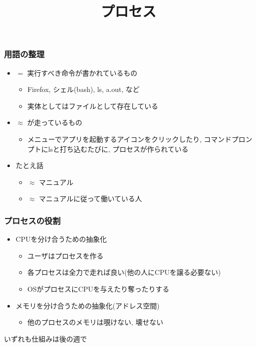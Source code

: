 \documentclass[12pt,dvipdfmx]{beamer}
\title{プロセス}
\begin{document}
\maketitle



\begin{frame}
\frametitle{用語の整理}
\begin{itemize}
\item {} $=$ 実行すべき命令が書かれているもの
  \begin{itemize}
  \item Firefox, シェル(bash), ls, a.out, など
  \item 実体としてはファイルとして存在している
  \end{itemize}
\item {} $\approx$ が走っているもの
  \begin{itemize}
  \item メニューでアプリを起動するアイコンをクリックしたり,
    コマンドプロンプトにlsと打ち込むたびに, プロセスが作られている
  \end{itemize}
\item たとえ話
  \begin{itemize}
  \item {} $\approx$ マニュアル
  \item {} $\approx$ マニュアルに従って働いている人
  \end{itemize}
\end{itemize}
\end{frame}

\begin{frame}
\frametitle{プロセスの役割}
\begin{itemize}
\item CPUを分け合うための抽象化
  \begin{itemize}
  \item ユーザはプロセスを作る
  \item 各プロセスは全力で走れば良い(他の人にCPUを譲る必要ない)
  \item OSがプロセスにCPUを与えたり奪ったりする
  \end{itemize}
\item メモリを分け合うための抽象化(アドレス空間)
  \begin{itemize}
  \item 他のプロセスのメモリは覗けない, 壊せない
  \end{itemize}
\end{itemize}
いずれも仕組みは後の週で
\end{frame}
\end{document}
